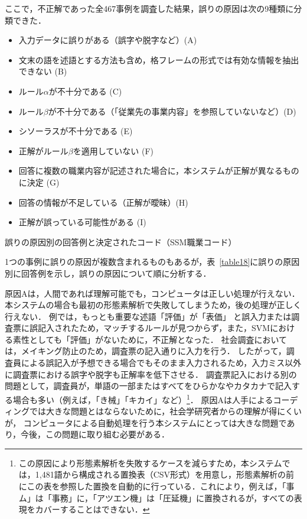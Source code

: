 \documentclass[japanese]{jnlp_1.4}
\begin{document}
ここで，不正解であった全467事例を調査した結果，誤りの原因は次の9種類に分類できた．

\begin{itemize}
 \item 入力データに誤りがある（誤字や脱字など）(A)
 \item 文末の語を述語とする方法も含め，格フレームの形式では有効な情報を抽出できない (B)
 \item ルール$\alpha$が不十分である (C)
 \item ルール$\beta$が不十分である（「従業先の事業内容」を参照していないなど）(D)
 \item シソーラスが不十分である (E)
 \item 正解がルール$\beta$を適用していない (F)
 \item 回答に複数の職業内容が記述された場合に，本システムが正解が異なるものに決定 (G) 
 \item 回答の情報が不足している（正解が曖昧）(H)
 \item 正解が誤っている可能性がある (I)
\end{itemize}

\begin{table}[b]
\caption{誤りの原因別の回答例と決定されたコード（SSM職業コード）}
\label{table18}

\end{table}

1つの事例に誤りの原因が複数含まれるものもあるが，表~\ref{table18}に誤りの原因別に回答例を示し，誤りの原因について順に分析する．

原因Aは，人間であれば理解可能でも，コンピュータは正しい処理が行えない． 
本システムの場合も最初の形態素解析で失敗してしまうため，後の処理が正しく行えない．
例では，もっとも重要な述語「評価」が「表価」 と誤入力または調査票に誤記入されたため，マッチするルールが見つからず，また，SVMにおける素性としても「評価」がないために，不正解となった．
社会調査においては，メイキング防止のため，調査票の記入通りに入力を行う．
したがって，調査員による誤記入が予想できる場合でもそのまま入力されるため，入力ミス以外に調査票における誤字や脱字も正解率を低下させる．
調査票記入における別の問題として，調査員が，単語の一部またはすべてをひらかなやカタカナで記入する場合も多い（例えば，「き械」「キカイ」など）\footnote{この原因により形態素解析を失敗するケースを減らすため，本システムでは，1,481語から構成される置換表（CSV形式）を用意し，形態素解析の前にこの表を参照した置換を自動的に行っている．これにより，例えば，「事ム」は「事務」に，「アツエン機」は「圧延機」に置換されるが，すべての表現をカバーすることはできない．}．
原因Aは人手によるコーディングでは大きな問題とはならないために，社会学研究者からの理解が得にくいが， コンピュータによる自動処理を行う本システムにとっては大きな問題であり，今後，この問題に取り組む必要がある．
\end{document}
